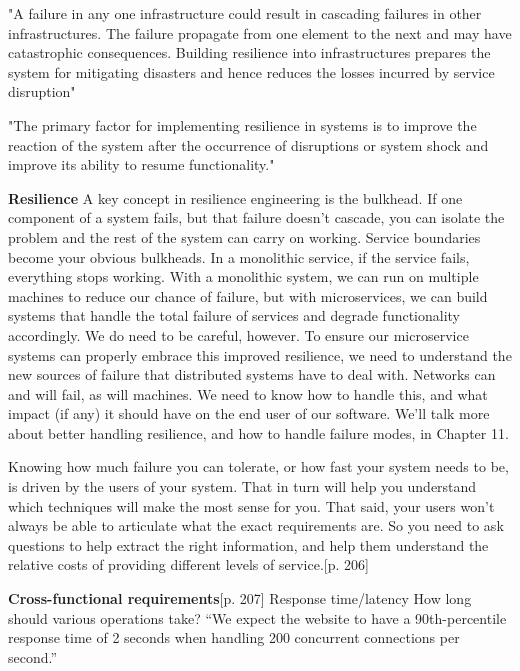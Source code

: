 {\cite[p. 4]{omer2013resilience}
"A failure in any one infrastructure could result in cascading failures in other infrastructures. The failure propagate from one element to the next and may have catastrophic consequences. Building resilience into infrastructures prepares the system for mitigating disasters and hence reduces the losses incurred by service disruption"


"The primary factor for implementing resilience in systems is to improve the reaction of the system after the occurrence of disruptions or system shock and improve its ability to resume functionality."

\textbf{Resilience} \cite[p. 5]{newman2015microservices} 
A key concept in resilience engineering is the bulkhead. If one component of a system fails, but that failure doesn’t cascade, you can isolate the problem and the rest of the system can carry on working. Service boundaries become your obvious bulkheads. In a monolithic service, if the service fails, everything stops working. With a monolithic system, we can run on multiple machines to reduce our chance of failure, but with microservices, we can build systems that handle the total failure of services and degrade functionality accordingly.
We do need to be careful, however. To ensure our microservice systems can properly embrace this improved resilience, we need to understand the new sources of failure that distributed systems have to deal with. Networks can and will fail, as will machines. We need to know how to handle this, and what impact (if any) it should have on the end user of our software.
We’ll talk more about better handling resilience, and how to handle failure modes, in Chapter 11.

Knowing how much failure you can tolerate, or how fast your system needs to be, is driven by the users of your system. That in turn will help you understand which techniques will make the most sense for you. That said, your users won’t always be able to articulate what the exact requirements are. So you need to ask questions to help extract the right information, and help them understand the relative costs of providing different levels of service.\cite{newman2015microservices}[p. 206]


\textbf{Cross-functional requirements}\cite{newman2015microservices}[p. 207]
Response time/latency
	How long should various operations take?
	“We expect the website to have a 90th-percentile response time of 2 seconds when handling 200 concurrent connections per second.”


}
